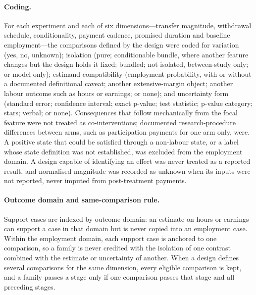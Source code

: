 \documentclass[11pt]{article}
\begin{document}
\paragraph{Coding.} For each experiment and each of six dimensions---transfer magnitude, withdrawal schedule, conditionality, payment cadence, promised duration and baseline employment---the comparisons defined by the design were coded for variation (yes, no, unknown); isolation (pure; conditionable bundle, where another feature changes but the design holds it fixed; bundled; not isolated, between-study only; or model-only); estimand compatibility (employment probability, with or without a documented definitional caveat; another extensive-margin object; another labour outcome such as hours or earnings; or none); and uncertainty form (standard error; confidence interval; exact p-value; test statistic; p-value category; stars; verbal; or none). Consequences that follow mechanically from the focal feature were not treated as co-interventions; documented research-procedure differences between arms, such as participation payments for one arm only, were. A positive state that could be satisfied through a non-labour state, or a label whose state definition was not established, was excluded from the employment domain. A design capable of identifying an effect was never treated as a reported result, and normalised magnitude was recorded as unknown when its inputs were not reported, never imputed from post-treatment payments.

\paragraph{Outcome domain and same-comparison rule.} Support cases are indexed by outcome domain: an estimate on hours or earnings can support a case in that domain but is never copied into an employment case. Within the employment domain, each support case is anchored to one comparison, so a family is never credited with the isolation of one contrast combined with the estimate or uncertainty of another. When a design defines several comparisons for the same dimension, every eligible comparison is kept, and a family passes a stage only if one comparison passes that stage and all preceding stages.
\end{document}
